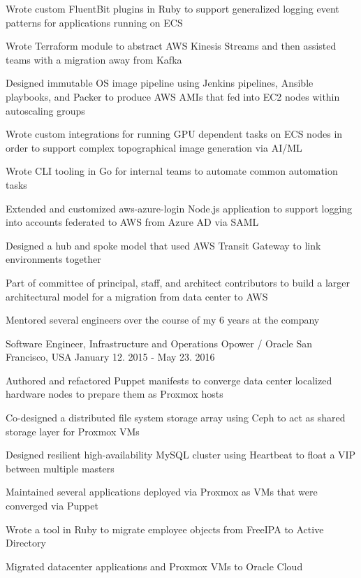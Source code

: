 \begin{cventries}
{\begin{cvitems}
        \item Wrote custom FluentBit plugins in Ruby to support generalized logging event patterns for applications running on ECS
        \item {Wrote Terraform module to abstract AWS Kinesis Streams and then assisted teams with a migration away from Kafka}
        \item {Designed immutable OS image pipeline using Jenkins pipelines, Ansible playbooks, and Packer to produce AWS AMIs that fed into EC2 nodes within autoscaling groups}
        \item {Wrote custom integrations for running GPU dependent tasks on ECS nodes in order to support complex topographical image generation via AI/ML}
        \item {Wrote CLI tooling in Go for internal teams to automate common automation tasks}
        \item {Extended and customized aws-azure-login Node.js application to support logging into accounts federated to AWS from Azure AD via SAML}
        \item {Designed a hub and spoke model that used AWS Transit Gateway to link environments together}
        \item {Part of committee of principal, staff, and architect contributors to build a larger architectural model for a migration from data center to AWS}
        \item {Mentored several engineers over the course of my 6 years at the company}
      \end{cvitems}
    }

  \cventry
    {Software Engineer, Infrastructure and Operations} %
    {Opower / Oracle} %
    {San Francisco, USA} %
    {January 12. 2015 - May 23. 2016} %
    {
      \begin{cvitems} %
        \item {Authored and refactored Puppet manifests to converge data center localized hardware nodes to prepare them as Proxmox hosts}
        \item {Co-designed a distributed file system storage array using Ceph to act as shared storage layer for Proxmox VMs}
        \item {Designed resilient high-availability MySQL cluster using Heartbeat to float a VIP between multiple masters}
        \item {Maintained several applications deployed via Proxmox as VMs that were converged via Puppet}
        \item {Wrote a tool in Ruby to migrate employee objects from FreeIPA to Active Directory}
        \item {Migrated datacenter applications and Proxmox VMs to Oracle Cloud}
      \end{cvitems}
    }


\end{cventries}
